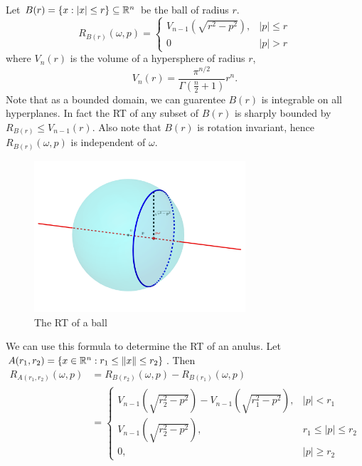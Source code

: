 \begin{myexample}
  Let $B(r) = \{x : |x| \leq r\} \subseteq \mathbb{R}^n$ be the ball of radius $r$.
  \[
    R_{B(r)}(\omega, p) = 
    \begin{cases}
      V_{n-1}\left(\sqrt{r^2 - p^2}\right), & |p| \leq r \\
      0 & |p| > r
    \end{cases}    
  \]
  where $V_n(r)$ is the volume of a hypersphere of radius $r$,
  \[
    V_n(r) = \frac{\pi^{n/2}}{\Gamma(\frac n2+1)} r^n.
  \]
  Note that as a bounded domain, we can guarentee $B(r)$ is integrable on all hyperplanes. In fact the RT of any subset of $B(r)$ is sharply bounded by $R_{B(r)} \leq V_{n-1}(r)$. Also note that $B(r)$ is rotation invariant, hence $R_{B(r)}(\omega, p)$ is independent of $\omega$.
  
  \begin{figure}[h]
    \centering
    \includegraphics[width=0.7\textwidth]{Images/Ball RT.png}
    \caption{The RT of a ball}\label{fig:RTBall}
  \end{figure}

  We can use this formula to determine the RT of an anulus. Let $A(r_1, r_2) = \{x \in \mathbb{R}^n: r_1 \leq \|x\| \leq r_2\}$. Then
  \begin{align*}
    R_{A(r_1, r_2)}(\omega, p) 
    &= R_{B(r_2)}(\omega, p) - R_{B(r_1)}(\omega, p) \\
    &= 
    \begin{cases}
      V_{n-1}(\sqrt{r_2^2 - p^2}) - V_{n-1}(\sqrt{r_1^2 - p^2}), & |p| < r_1 \\
      V_{n-1}(\sqrt{r_2^2 - p^2}), & r_1 \leq |p| \leq r_2 \\
      0, & |p| \geq r_2
    \end{cases}
  \end{align*}
\end{myexample}



